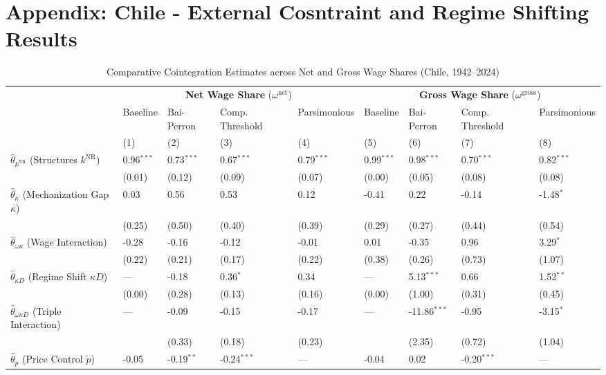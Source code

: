 \section{Appendix: Chile - External Cosntraint and Regime Shifting Results}
\label{app:chile_full_results}
\begin{table}[h!]
	\centering
	\caption{Comparative Cointegration Estimates across Net and Gross Wage Shares (Chile, 1942--2024)}
	\label{tab:chile_omega_comparison}
	\small
	\begin{tabular}{p{3.5cm}p{1.35cm}p{1.35cm}p{1.35cm}p{1.35cm}p{1.35cm}p{1.35cm}p{1.35cm}p{1.35cm}}
		\toprule
		& \multicolumn{4}{c}{\textbf{Net Wage Share} ($\omega^{\text{net}}$)} & \multicolumn{4}{c}{\textbf{Gross Wage Share} ($\omega^{\text{gross}}$)} \\
		\cmidrule(lr){2-5} \cmidrule(lr){6-9}
		& Baseline & Bai-Perron & Comp. Threshold & Parsimonious & Baseline & Bai-Perron & Comp. Threshold & Parsimonious \\
		& (1) & (2) & (3) & (4) & (5) & (6) & (7) & (8) \\
		\midrule
		$\hat{\theta}_{k^{\text{NR}}}$ (Structures $k^{\text{NR}}$) & 0.96$^{***}$ & 0.73$^{***}$ & 0.67$^{***}$ & 0.79$^{***}$ & 0.99$^{***}$ & 0.98$^{***}$ & 0.70$^{***}$ & 0.82$^{***}$ \\
		& (0.01) & (0.12) & (0.09) & (0.07) & (0.00) & (0.05) & (0.08) & (0.08) \\
		$\hat{\theta}_{\kappa}$ (Mechanization Gap $\kappa$) & 0.03 & 0.56 & 0.53 & 0.12 & -0.41 & 0.22 & -0.14 & -1.48$^{*}$ \\
		& (0.25) & (0.50) & (0.40) & (0.39) & (0.29) & (0.27) & (0.44) & (0.54) \\
		$\hat{\theta}_{\omega\kappa}$ (Wage Interaction) & -0.28 & -0.16 & -0.12 & -0.01 & 0.01 & -0.35 & 0.96 & 3.29$^{*}$ \\
		& (0.22) & (0.21) & (0.17) & (0.22) & (0.38) & (0.26) & (0.73) & (1.07) \\
		$\hat{\theta}_{\kappa D}$ (Regime Shift $\kappa D$) & — & -0.18 & 0.36$^{*}$ & 0.34 & — & 5.13$^{***}$ & 0.66 & 1.52$^{**}$ \\
		& (0.00) & (0.28) & (0.13) & (0.16) & (0.00) & (1.00) & (0.31) & (0.45) \\
		$\hat{\theta}_{\omega\kappa D}$ (Triple Interaction) & — & -0.09 & -0.15 & -0.17 & — & -11.86$^{***}$ & -0.95 & -3.15$^{*}$ \\
		&  & (0.33) & (0.18) & (0.23) &  & (2.35) & (0.72) & (1.04) \\
		$\hat{\theta}_{p}$ (Price Control $\tilde{p}$) & -0.05 & -0.19$^{**}$ & -0.24$^{***}$ & — & -0.04 & 0.02 & -0.20$^{***}$ & — \\

\end{tabular}
\end{table}
